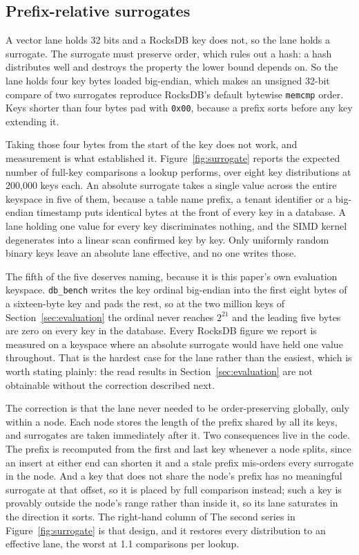 \documentclass[conference]{IEEEtran}
\begin{document}
\subsection{Prefix-relative surrogates}
\label{sec:surrogate}

A vector lane holds 32 bits and a RocksDB key does not, so the lane holds a
surrogate. The surrogate must preserve order, which rules out a hash: a hash
distributes well and destroys the property the lower bound depends on. So the lane
holds four key bytes loaded big-endian, which makes an unsigned 32-bit compare of
two surrogates reproduce RocksDB's default bytewise \texttt{memcmp} order. Keys
shorter than four bytes pad with \texttt{0x00}, because a prefix sorts before any
key extending it.


Taking those four bytes from the start of the key does not work, and measurement
is what established it. Figure~\ref{fig:surrogate} reports the expected number of
full-key comparisons a lookup performs, over eight key distributions at 200{,}000
keys each. An absolute surrogate takes a single value across the entire keyspace in
five of them, because a table name prefix, a tenant identifier or a big-endian
timestamp puts identical bytes at the front of every key in a database. A lane
holding one value for every key discriminates nothing, and the SIMD kernel
degenerates into a linear scan confirmed key by key. Only uniformly random binary
keys leave an absolute lane effective, and no one writes those.

The fifth of the five deserves naming, because it is this paper's own evaluation
keyspace. \texttt{db\_bench} writes the key ordinal big-endian into the first eight
bytes of a sixteen-byte key and pads the rest, so at the two million keys of
Section~\ref{sec:evaluation} the ordinal never reaches $2^{21}$ and the leading
five bytes are zero on every key in the database. Every RocksDB figure we report is
measured on a keyspace where an absolute surrogate would have held one value
throughout. That is the hardest case for the lane rather than the easiest, which is
worth stating plainly: the read results in Section~\ref{sec:evaluation} are not
obtainable without the correction described next.

The correction is that the lane never needed to be order-preserving globally, only
within a node. Each node stores the length of the prefix shared by all its keys,
and surrogates are taken immediately after it. Two consequences live in the code.
The prefix is recomputed from the first and last key whenever a node splits, since
an insert at either end can shorten it and a stale prefix mis-orders every
surrogate in the node. And a key that does not share the node's prefix has no
meaningful surrogate at that offset, so it is placed by full comparison instead;
such a key is provably outside the node's range rather than inside it, so its lane
saturates in the direction it sorts. The right-hand column of
The second series in Figure~\ref{fig:surrogate} is that design, and it restores every distribution to an
effective lane, the worst at 1.1 comparisons per lookup.
\end{document}
